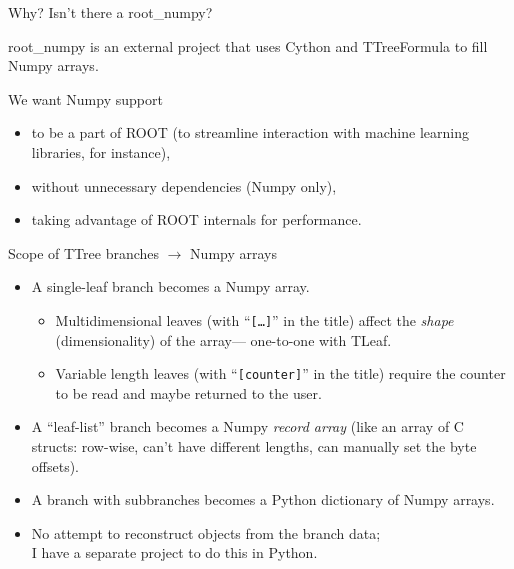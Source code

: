\documentclass{beamer}
\begin{document}
\begin{frame}{Why? Isn't there a root\_numpy?}
\vspace{0.5 cm}
\large

root\_numpy is an external project that uses Cython and TTreeFormula to fill Numpy arrays.

\vspace{0.5 cm}
We want Numpy support
\begin{itemize}
\item to be a part of ROOT (to streamline interaction with machine learning libraries, for instance),
\item without unnecessary dependencies (Numpy only),
\item taking advantage of ROOT internals for performance.
\end{itemize}

\vspace{0.5 cm}
\end{frame}

\begin{frame}{Scope of TTree branches $\to$ Numpy arrays}
\vspace{0.5 cm}
\large
\begin{itemize}\setlength{\itemsep}{0.25 cm}
\item<1-> A single-leaf branch becomes a Numpy array.

\vspace{0.15 cm}
\begin{itemize}\setlength{\itemsep}{0.25 cm}
\item<2-> Multidimensional leaves (with ``{\tt[\ldots]}'' in the title) affect the {\it shape} (dimensionality) of the array--- one-to-one with TLeaf.
\item<3-> Variable length leaves (with ``{\tt[counter]}'' in the title) require the counter to be read and maybe returned to the user.
\end{itemize}

\item<4-> A ``leaf-list'' branch becomes a Numpy {\it record array} (like an array of C structs: row-wise, can't have different lengths, can manually set the byte offsets).

\item<5-> A branch with subbranches becomes a Python dictionary of Numpy arrays.

\item<6-> No attempt to reconstruct objects from the branch data; \\ I have a separate project to do this in Python.
\end{itemize}
\end{frame}
\end{document}
